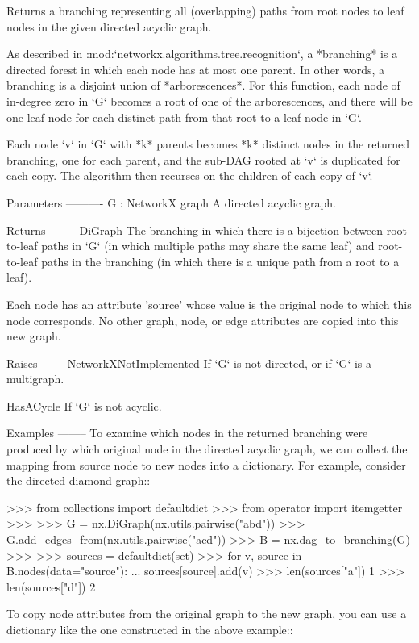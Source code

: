 \begin{DoxyVerb}Returns a branching representing all (overlapping) paths from
root nodes to leaf nodes in the given directed acyclic graph.

As described in :mod:`networkx.algorithms.tree.recognition`, a
*branching* is a directed forest in which each node has at most one
parent. In other words, a branching is a disjoint union of
*arborescences*. For this function, each node of in-degree zero in
`G` becomes a root of one of the arborescences, and there will be
one leaf node for each distinct path from that root to a leaf node
in `G`.

Each node `v` in `G` with *k* parents becomes *k* distinct nodes in
the returned branching, one for each parent, and the sub-DAG rooted
at `v` is duplicated for each copy. The algorithm then recurses on
the children of each copy of `v`.

Parameters
----------
G : NetworkX graph
    A directed acyclic graph.

Returns
-------
DiGraph
    The branching in which there is a bijection between root-to-leaf
    paths in `G` (in which multiple paths may share the same leaf)
    and root-to-leaf paths in the branching (in which there is a
    unique path from a root to a leaf).

    Each node has an attribute 'source' whose value is the original
    node to which this node corresponds. No other graph, node, or
    edge attributes are copied into this new graph.

Raises
------
NetworkXNotImplemented
    If `G` is not directed, or if `G` is a multigraph.

HasACycle
    If `G` is not acyclic.

Examples
--------
To examine which nodes in the returned branching were produced by
which original node in the directed acyclic graph, we can collect
the mapping from source node to new nodes into a dictionary. For
example, consider the directed diamond graph::

    >>> from collections import defaultdict
    >>> from operator import itemgetter
    >>>
    >>> G = nx.DiGraph(nx.utils.pairwise("abd"))
    >>> G.add_edges_from(nx.utils.pairwise("acd"))
    >>> B = nx.dag_to_branching(G)
    >>>
    >>> sources = defaultdict(set)
    >>> for v, source in B.nodes(data="source"):
    ...     sources[source].add(v)
    >>> len(sources["a"])
    1
    >>> len(sources["d"])
    2

To copy node attributes from the original graph to the new graph,
you can use a dictionary like the one constructed in the above
example::


\end{DoxyVerb}
